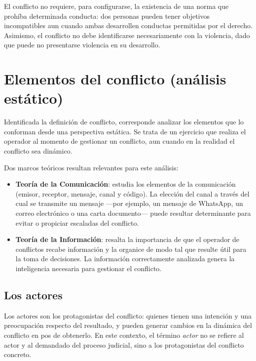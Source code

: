 \documentclass[12pt,oneside]{book}
\begin{document}
\begin{important}
El conflicto no requiere, para configurarse, la existencia de una norma que prohíba determinada conducta: dos personas pueden tener objetivos incompatibles aun cuando ambas desarrollen conductas permitidas por el derecho. Asimismo, el conflicto no debe identificarse necesariamente con la violencia, dado que puede no presentarse violencia en su desarrollo.
\end{important}

\section{Elementos del conflicto (análisis estático)}

Identificada la definición de conflicto, corresponde analizar los elementos que lo conforman desde una perspectiva estática. Se trata de un ejercicio que realiza el operador al momento de gestionar un conflicto, aun cuando en la realidad el conflicto sea dinámico.

Dos marcos teóricos resultan relevantes para este análisis:
\begin{itemize}
    \item \textbf{Teoría de la Comunicación}: estudia los elementos de la comunicación (emisor, receptor, mensaje, canal y código). La elección del canal a través del cual se transmite un mensaje ---por ejemplo, un mensaje de WhatsApp, un correo electrónico o una carta documento--- puede resultar determinante para evitar o propiciar escaladas del conflicto.
    \item \textbf{Teoría de la Información}: resalta la importancia de que el operador de conflictos recabe información y la organice de modo tal que resulte útil para la toma de decisiones. La información correctamente analizada genera la inteligencia necesaria para gestionar el conflicto.
\end{itemize}

\subsection{Los actores}

Los actores son los protagonistas del conflicto: quienes tienen una intención y una preocupación respecto del resultado, y pueden generar cambios en la dinámica del conflicto en pos de obtenerlo. En este contexto, el término \textit{actor} no se refiere al actor y al demandado del proceso judicial, sino a los protagonistas del conflicto concreto.
\end{document}
